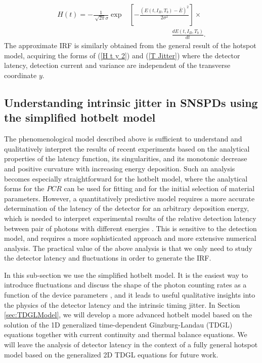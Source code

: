 \documentclass[%
reprint,
 amsmath,amssymb,
aps,
pra,
]{revtex4-1}
\begin{document}
\begin{equation}\label{main H}
\begin{aligned}
H(t)=-\frac{1}{\sqrt[]{2\pi}\sigma}\exp&\left[-\frac{\left(E\left(t, I_B,T_b\right) - \bar{E}\right)^2}{2{\sigma}^2}\right]\times\\
&\qquad\qquad\qquad\frac{dE\left(t, I_B,T_b\right)}{dt}.
\end{aligned}
\end{equation}
The approximate IRF is similarly obtained from the general result of the hotspot model, acquiring the forms of (\ref{H t y 2}) and (\ref{T Jitter}) where the detector latency, detection current and variance are independent of the transverse coordinate \(y\).

\subsection{\label{sec:SimplfiedHBModel}Understanding intrinsic jitter in SNSPDs using the simplified hotbelt model}
\quad The phenomenological model described above is sufficient to understand and qualitatively interpret the results of recent experiments \cite{korzh_demonstrating_2018} based on the analytical properties of the latency function, its singularities, and its monotonic decrease and positive curvature with increasing energy deposition. Such an analysis becomes especially straightforward for the hotbelt model, where the analytical forms for the \(PCR\) can be used for fitting and for the initial selection of material parameters. However, a quantitatively predictive model requires a more accurate determination of the latency of the detector for an arbitrary deposition energy, which is needed to interpret experimental results of the relative detection latency between pair of photons with different energies \cite{korzh_demonstrating_2018}.  This is sensitive to the detection model, and requires a more sophisticated approach and more extensive numerical analysis. The practical value of the above analysis is that we only need to study the detector latency and fluctuations in order to generate the IRF.

\quad In this sub-section we use the simplified hotbelt model. It is the easiest way to introduce fluctuations and discuss the shape of the photon counting rates as a function of the device parameters \cite{kozorezov_fano_2017}, and it leads to useful qualitative insights into the physics of the detector latency and the intrinsic timing jitter. In Section \ref{sec:TDGLModel}, we will develop a more advanced hotbelt model based on the solution of the 1D generalized time-dependent Ginzburg-Landau (TDGL) equations together with current continuity and thermal balance equations. We will leave the analysis of detector latency in the context of a fully general hotspot model based on the generalized 2D TDGL equations for future work.
\end{document}
